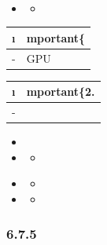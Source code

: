 \hypertarget{section-137}{%
\paragraph{}\label{section-137}}


\begin{itemize}
\item
  \begin{itemize}
  \tightlist
  \item
  \end{itemize}
\end{itemize}

\begin{longtable}[]{@{}ll@{}}
\toprule\noalign{}
\i & mportant\{} \\
\midrule\noalign{}
\endhead
\bottomrule\noalign{}
\endlastfoot
- & GPU \\
\end{longtable}

\begin{longtable}[]{@{}ll@{}}
\toprule\noalign{}
\i & mportant\{2. } \\
\midrule\noalign{}
\endhead
\bottomrule\noalign{}
\endlastfoot
- & \important{} \\
\end{longtable}

\begin{itemize}
\item
\item
  \begin{itemize}
  \tightlist
  \item
  \end{itemize}
\end{itemize}

\important{}

\begin{itemize}
\item
  \begin{itemize}
  \tightlist
  \item
  \end{itemize}
\item
  \begin{itemize}
  \tightlist
  \item
  \end{itemize}
\end{itemize}

\hypertarget{section-138}{%
\subsubsection{6.7.5}\label{section-138}}

